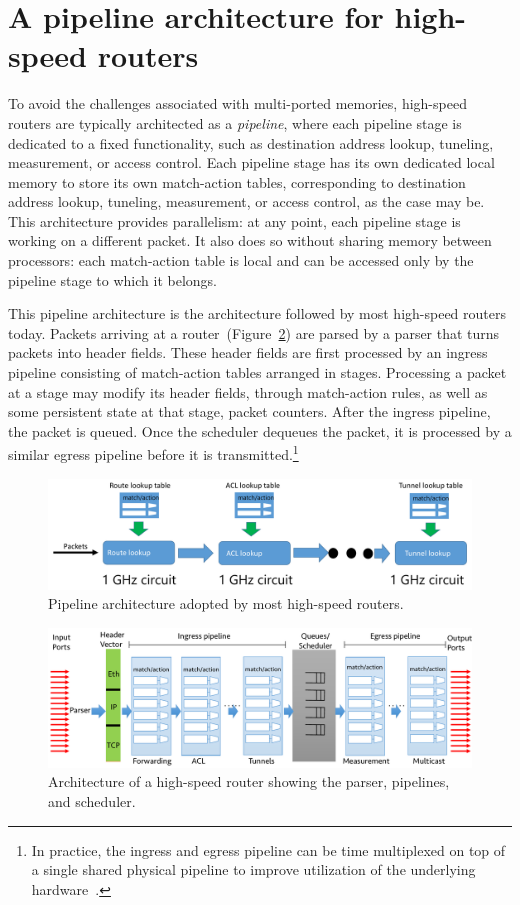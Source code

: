\section{A pipeline architecture for high-speed routers}
To avoid the challenges associated with multi-ported memories, high-speed
routers are typically architected as a {\em pipeline}, where each pipeline
stage is dedicated to a fixed functionality, such as destination address
lookup, tuneling, measurement, or access control. Each pipeline stage has its
own dedicated local memory to store its own match-action tables, corresponding
to destination address lookup, tuneling, measurement, or access control, as the
case may be. This architecture provides parallelism: at any point, each
pipeline stage is working on a different packet. It also does so without
sharing memory between processors: each match-action table is local and can be
accessed only by the pipeline stage to which it belongs.

This pipeline architecture is the architecture followed by most high-speed
routers today. Packets arriving at a
router~(Figure~\ref{fig:detailed_pipeline}) are parsed by a parser that turns
packets into header fields. These header fields are first processed by an
ingress pipeline consisting of match-action tables arranged in stages.
Processing a packet at a stage may modify its header fields, through
match-action rules, as well as some persistent state at that stage, \eg packet
counters. After the ingress pipeline, the packet is queued. Once the scheduler
dequeues the packet, it is processed by a similar egress pipeline before it is
transmitted.\footnote{In practice, the ingress and egress pipeline can be time
multiplexed on top of a single shared physical pipeline to improve utilization
of the underlying hardware~\cite{rmt}.}

\begin{figure}[!t]
\includegraphics[width=\textwidth]{pipeline.pdf}
\caption{Pipeline architecture adopted by most high-speed routers.}
\label{fig:pipeline}
\end{figure}

\begin{figure}[!t]
\includegraphics[width=\textwidth]{detailed_pipeline.pdf}
\caption{Architecture of a high-speed router showing the parser, pipelines, and scheduler.}
\label{fig:detailed_pipeline}
\end{figure}

